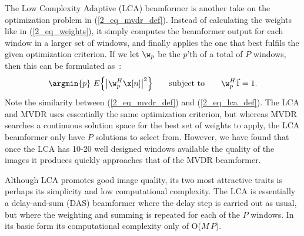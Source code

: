 {The Low Complexity Adaptive (LCA) beamformer is another take on the optimization problem in (\ref{2_eq_mvdr_def}). Instead of calculating the weights like in (\ref{2_eq_weights}), it simply computes the beamformer output for each window in a larger set of windows, and finally applies the one that best fulfils the given optimization criterion. If we let $\w_p$ be the $p$'th of a total of $P$ windows, then this can be formulated as~\cite{Synnevag2008}:
\begin{gather}
\argmin{p}\ E\Big\{\big|\w_p^H\x[n]\big|^2\Big\} \qquad\text{subject to}\qquad \w_p^H\1 = 1. \label{2_eq_lca_def}
\end{gather}
Note the similarity between (\ref{2_eq_mvdr_def}) and (\ref{2_eq_lca_def}). The LCA and MVDR uses essentially the same optimization criterion, but whereas MVDR searches a continuous solution space for the best set of weights to apply, the LCA beamformer only have $P$ solutions to select from. However, we have found that once the LCA has 10-20 well designed windows available the quality of the images it produces quickly approaches that of the MVDR beamformer.

Although LCA promotes good image quality, its two most attractive traits is perhaps its simplicity and low computational complexity. The LCA is essentially a delay-and-sum (DAS) beamformer where the delay step is carried out as usual, but where the weighting and summing is repeated for each of the $P$ windows. In its basic form its computational complexity only of O($M\,P$).








}
